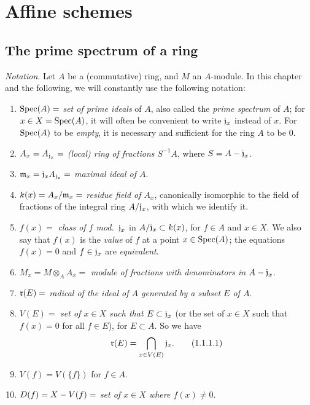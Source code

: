\setcounter{section}{0}
\section{Affine schemes}
\label{section-affine-schemes}

\setcounter{subsection}{0}
\subsection{The prime spectrum of a ring}
\label{subsection-prime-spec}

\begin{env}[1.1.1]
\label{1.1.1.1}
\emph{Notation}. Let $A$ be a (commutative) ring, and $M$ an $A$-module.
In this chapter and the following, we will constantly use the following notation:
\begin{enumerate}[label=--]
  \item ${\mathop{\mathrm{Spec}}\nolimits}(A)=$ \emph{set of prime ideals} of $A$, also called the \emph{prime spectrum} of $A$; for $x\in X={\mathop{\mathrm{Spec}}\nolimits}(A)$, it will often be convenient to write $\mathfrak{j}_x$ instead of $x$.
    For ${\mathop{\mathrm{Spec}}\nolimits}(A)$ to be \emph{empty}, it is necessary and sufficient for the ring $A$ to be $0$.
  \item $A_x=A_{\mathfrak{j}_x}=$ \emph{(local) ring of fractions $S^{-1}A$}, where $S=A-\mathfrak{j}_x$.
  \item $\mathfrak{m}_x=\mathfrak{j}_x A_{\mathfrak{j}_x}=$ \emph{maximal ideal of $A$}.
  \item $k(x)=A_x/\mathfrak{m}_x=$ \emph{residue field of $A_x$}, canonically isomorphic to the field of fractions of the integral ring $A/\mathfrak{j}_x$, with which we identify it.
  \item $f(x)=$ \emph{class of $f$ mod.~$\mathfrak{j}_x$} in $A/\mathfrak{j}_x\subset k(x)$, for $f\in A$ and $x\in X$.
    We also say that $f(x)$ is the \emph{value} of $f$ at a point $x\in{\mathop{\mathrm{Spec}}\nolimits}(A)$; the equations $f(x)=0$ and $f\in\mathfrak{j}_x$ are \emph{equivalent}.
  \item $M_x=M\otimes_A A_x=$ \emph{module of fractions with denominators in $A-\mathfrak{j}_x$}.
  \item $\mathfrak{r}(E)=$ \emph{radical of the ideal of $A$ generated by a subset $E$ of $A$}.
  \item $V(E)=$ \emph{set of $x\in X$ such that $E\subset\mathfrak{j}_x$} (or the set of $x\in X$ such that $f(x)=0$ for all $f\in E$), for $E\subset A$.
    So we have
    \begin{equation*}
      \label{1.1.1.1.1}
      \mathfrak{r}(E)=\bigcap_{x\in V(E)}\mathfrak{j}_x.
      \tag{1.1.1.1}
    \end{equation*}
  \item $V(f)=V(\{f\})$ for $f\in A$.
  \item $D(f)=X- V(f)=$ \emph{set of $x\in X$ where $f(x)\neq 0$}.
\end{enumerate}
\end{env}

